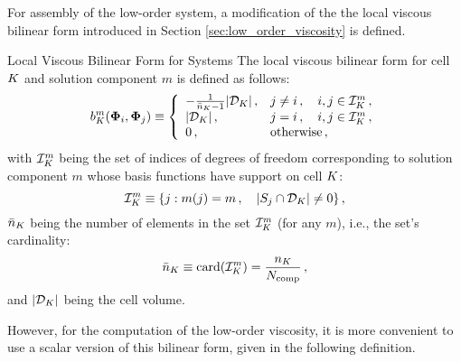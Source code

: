 For assembly of the low-order system, a modification of the
the local viscous bilinear form introduced in Section \ref{sec:low_order_viscosity}
is defined.
\begin{definition}{Local Viscous Bilinear Form for Systems}
   The local viscous bilinear form for cell $K$ and solution component
   $m$ is defined as follows:
   \begin{equation}\label{eq:bilinearform_system}
     \localvisc_{\cell}^m(\vectortestfunction_i,\vectortestfunction_j)
       \equiv \left\{\begin{array}{l l}
         -\frac{1}{\cardsystem_\cell - 1}\cellvolume\eqc & j\ne i\eqc
       \quad i,j\in \indicescell^m\eqc \\
       \cellvolume\eqc & j = i \eqc \quad i,j\in \indicescell^m\eqc \\
       0          \eqc & \mbox{otherwise}\eqc
     \end{array}\right.
   \end{equation}
   with $\indicescell^m$ being the set of indices of degrees of
   freedom corresponding to solution component $m$ whose basis functions
   have support on cell $K$:
   \begin{equation}
     \indicescell^m \equiv \{ j :
       \componentindex(j) = m \eqc \quad|\support_j\cap \celldomain|\ne 0\}
     \eqc
   \end{equation}
   $\bar{n}_K$ being the number of elements in the set $\indicescell^m$
   (for any $m$), i.e., the set's cardinality:
   \begin{equation}
     \cardsystem_\cell \equiv \textup{card}(\indicescell^m) =
       \frac{\cardinality}{\ncomponents}
     \eqc
   \end{equation} 
   and $|\mathcal{D}_K|$ being the cell volume.
\end{definition}
However, for the computation of the low-order viscosity, it is more convenient
to use a scalar version of this bilinear form, given in the following definition.
